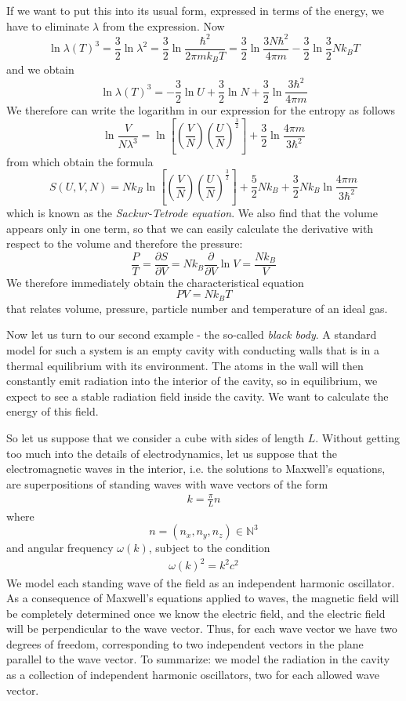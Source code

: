 \documentclass[a4paper, draft]{article}
\theoremstyle{own}
\theoremstyle{remark}
\newcommand{\N}{\mathbb{N}}
\begin{document}
If we want to put this into its usual form, expressed in terms of the energy, we have to eliminate $\lambda$ from the expression. Now
$$
\ln \lambda(T)^3 = \frac{3}{2} \ln \lambda^2 = \frac{3}{2} \ln 
\frac{\hbar^2 }{2\pi m k_B T} = \frac{3}{2} \ln \frac{3 N \hbar^2 }{4\pi m} - 
\frac{3}{2} \ln \frac{3}{2} N k_B T
$$
and we obtain
$$
\ln \lambda(T)^3 = - \frac{3}{2} \ln U  + \frac{3}{2} \ln N 
+ \frac{3}{2} \ln \frac{3 \hbar^2 }{4\pi m}
$$
We therefore can write the logarithm in our expression for the entropy as follows
$$
\ln \frac{V}{N\lambda^3} = 
\ln \left[ (\frac{V}{N}) {(\frac{U}{N})}^{\frac{3}{2}} \right]
+ \frac{3}{2} \ln \frac{4\pi m}{3 \hbar^2}
$$
from which obtain the formula
$$
S(U,V,N) = N k_B \ln \left[ (\frac{V}{N}) {(\frac{U}{N})}^{\frac{3}{2}} \right]
+ \frac{5}{2} N k_B
+ \frac{3}{2} N k_B \ln \frac{4\pi m}{3 \hbar^2} 
$$
which is known as the {\em Sackur-Tetrode equation}. We also find that the volume appears only in one term, so that we can easily calculate the derivative with respect to the volume and therefore the pressure:
$$
\frac{P}{T} = 
\frac{\partial S}{\partial V} = 
N k_B\frac{\partial}{\partial V} \ln V = \frac{N k_B}{V}
$$
We therefore immediately obtain the characteristical equation
$$
P V = N k_B T
$$
that relates volume, pressure, particle number and temperature of an ideal gas.


Now let us turn to our second example - the so-called {\em black body}. A standard model for such a system is an empty cavity with conducting walls that is in a thermal equilibrium with its environment. The atoms in the wall will then constantly emit radiation into the interior of the cavity, so in equilibrium, we expect to see a stable radiation field inside the cavity. We want to calculate the energy of this field.

So let us suppose that we consider a cube with sides of length $L$. Without getting too much into the details of electrodynamics, let us suppose that the electromagnetic waves in the interior, i.e. the solutions to Maxwell's equations, are superpositions of standing waves with wave vectors of the form 
\begin{align}\label{eq:allowedwavectors}
k = \frac{\pi}{L} n
\end{align}
where 
$$
n = (n_x, n_y, n_z) \in {\N}^3
$$
and angular frequency $\omega(k)$, subject to the condition
\begin{align}\label{eq:dispersionrelation}
\omega(k)^2 = k^2 c^2
\end{align}
We model each standing wave of the field as an independent harmonic oscillator. As a consequence of Maxwell's equations applied to waves, the magnetic field will be completely determined once we know the electric field, and the electric field will be perpendicular to the wave vector. Thus, for each wave vector we have two degrees of freedom, corresponding to two independent vectors in the plane parallel to the wave vector. To summarize: we model the radiation in the cavity as a collection of independent harmonic oscillators, two for each allowed wave vector.
\end{document}
